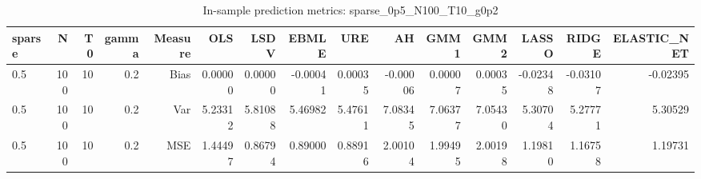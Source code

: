 \begin{table}[!htbp]\centering
\caption{In-sample prediction metrics: sparse_0p5_N100_T10_g0p2}
\label{tab:table2_sparse_0p5_N100_T10_g0p2}
\begin{tabular}{lrrrrrrrrrrrrrr}
\hline
sparse & N & T0 & gamma & Measure & OLS & LSDV & EBMLE & URE & AH & GMM1 & GMM2 & LASSO & RIDGE & ELASTIC_NET \\
\hline
0.5 & 100 & 10 & 0.2 & Bias & 0.00000 & 0.00000 & -0.00041 & 0.00035 & -0.00006 & 0.00007 & 0.00035 & -0.02348 & -0.03107 & -0.02395 \\
0.5 & 100 & 10 & 0.2 & Var & 5.23312 & 5.81088 & 5.46982 & 5.47611 & 7.08345 & 7.06377 & 7.05430 & 5.30704 & 5.27771 & 5.30529 \\
0.5 & 100 & 10 & 0.2 & MSE & 1.44497 & 0.86794 & 0.89000 & 0.88916 & 2.00104 & 1.99495 & 2.00198 & 1.19810 & 1.16758 & 1.19731 \\
\hline
\end{tabular}
\end{table}

